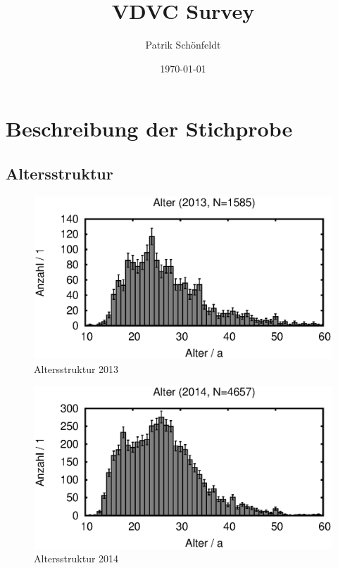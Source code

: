 \documentclass[11pt]{scrartcl}
\title{VDVC Survey}
\author{Patrik Schönfeldt}
\date{\today}
\begin{document}
\maketitle

\section{Beschreibung der Stichprobe}
\subsection{Altersstruktur}

\begin{figure}[htbp]
   \centering
   \includegraphics{2013/alter.eps} %
   \caption{Altersstruktur 2013}
   \label{fig:2013-alter}
\end{figure}

\begin{figure}[htbp]
   \centering
   \includegraphics{2014/alter} %
   \caption{Altersstruktur 2014}
   \label{fig:2014-alter}
\end{figure}
\end{document}
